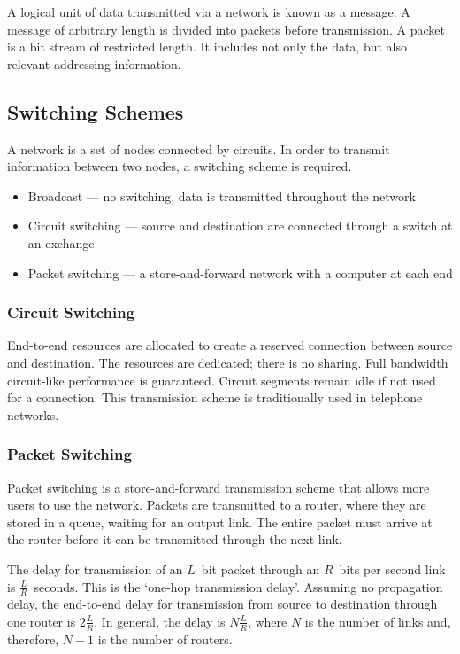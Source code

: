 A logical unit of data transmitted via a network is known as a message.
A message of arbitrary length is divided into packets before transmission.
A packet is a bit stream of restricted length.
It includes not only the data, but also relevant addressing information.

\subsection{Switching Schemes}

A network is a set of nodes connected by circuits.
In order to transmit information between two nodes, a switching scheme is required.
\begin{itemize}
  \item Broadcast --- no switching, data is transmitted throughout the network
  \item Circuit switching --- source and destination are connected through a switch at an exchange
  \item Packet switching --- a store-and-forward network with a computer at each end
\end{itemize}

\subsubsection{Circuit Switching}

End-to-end resources are allocated to create a reserved connection between source and destination.
The resources are dedicated; there is no sharing.
Full bandwidth circuit-like performance is guaranteed.
Circuit segments remain idle if not used for a connection.
This transmission scheme is traditionally used in telephone networks.

\subsubsection{Packet Switching}

Packet switching is a store-and-forward transmission scheme that allows more users to use the network.
Packets are transmitted to a router, where they are stored in a queue, waiting for an output link.
The entire packet must arrive at the router before it can be transmitted through the next link.

The delay for transmission of an \( L \)~bit packet through an \( R \)~bits per second link is \( \frac{L}{R} \)~seconds.
This is the `one-hop transmission delay'.
Assuming no propagation delay, the end-to-end delay for transmission from source to destination through one router is \( 2 \frac{L}{R} \).
In general, the delay is \( N \frac{L}{R} \), where \( N \) is the number of links and, therefore, \( N - 1 \) is the number of routers.

